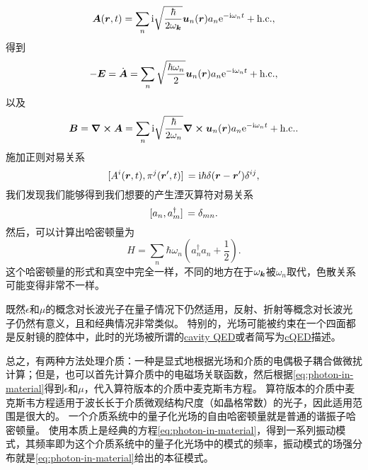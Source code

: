 \documentclass[UTF8, a4paper]{ctexart}
\newcommand*{\ee}{\mathrm{e}}
\newcommand*{\ii}{\mathrm{i}}
\newcommand{\concept}[1]{\underline{#1}}
\begin{document}
\begin{equation}
    \vb*{A}(\vb*{r}, t) = \sum_n \ii \sqrt{\frac{\hbar}{2\omega_{\vb*{k}}}} \vb*{u}_n(\vb*{r}) a_n \ee^{- \ii \omega_n t} + \text{h.c.},
\end{equation}
得到
\begin{equation}
    - \vb*{E} = \dot{\vb*{A}} = \sum_n \sqrt{\frac{\hbar \omega_n}{2}} \vb*{u}_n(\vb*{r}) a_n \ee^{-\ii \omega_n t} + \text{h.c.},
\end{equation}
以及
\begin{equation}
    \vb*{B} = \curl{\vb*{A}} = \sum_n \ii \sqrt{\frac{\hbar}{2\omega_n}} \curl{\vb*{u}_n(\vb*{r})} a_n \ee^{-\ii \omega_n t} + \text{h.c.}.
\end{equation}
施加正则对易关系
\begin{equation}
    \comm*{A^i(\vb*{r}, t)}{\pi^j(\vb*{r}', t)} = \ii \hbar \delta(\vb*{r} - \vb*{r}') \delta^{ij},
\end{equation}
我们发现我们能够得到我们想要的产生湮灭算符对易关系
\begin{equation}
    \comm*{a_n}{a_m^\dagger} = \delta_{mn}.
\end{equation}
然后，可以计算出哈密顿量为
\begin{equation}
    H = \sum_n \hbar \omega_n \left( a^\dagger_n a_n + \frac{1}{2} \right).
\end{equation}
这个哈密顿量的形式和真空中完全一样，不同的地方在于$\omega_{\vb*{k}}$被$\omega_n$取代，色散关系可能变得非常不一样。

既然$\epsilon$和$\mu$的概念对长波光子在量子情况下仍然适用，反射、折射等概念对长波光子仍然有意义，且和经典情况非常类似。
特别的，光场可能被约束在一个四面都是反射镜的腔体中，此时的光场被所谓的\concept{cavity QED}或者简写为\concept{cQED}描述。

总之，有两种方法处理介质：一种是显式地根据光场和介质的电偶极子耦合做微扰计算；但是，也可以首先计算介质中的电磁场关联函数，然后根据\eqref{eq:photon-in-material}得到$\epsilon$和$\mu$，代入算符版本的介质中麦克斯韦方程。
算符版本的介质中麦克斯韦方程适用于波长长于介质微观结构尺度（如晶格常数）的光子，因此适用范围是很大的。
一个介质系统中的量子化光场的自由哈密顿量就是普通的谐振子哈密顿量。
使用本质上是经典的方程\eqref{eq:photon-in-material}，得到一系列振动模式，其频率即为这个介质系统中的量子化光场中的模式的频率，振动模式的场强分布就是\eqref{eq:photon-in-material}给出的本征模式。
\end{document}
